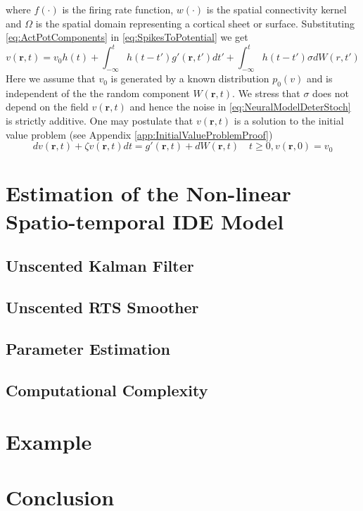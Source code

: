 \documentclass[11pt,draftcls,onecolumn,peerreview]{IEEEtran}
\begin{document}
where $f(\cdot)$ is the firing rate function, $w(\cdot)$ is the spatial connectivity kernel and $\Omega$ is the spatial domain representing a cortical sheet or surface. Substituting \eqref{eq:ActPotComponents} in \eqref{eq:SpikesToPotential} we get
\begin{equation}\label{eq:NeuralModelDeterStoch}
v\left( {\mathbf{r},t} \right)=v_0h(t)+\int_{ - \infty }^t {h\left( {t - t'} \right)g'\left( {\mathbf{r},t'} \right)dt'}+ \int_{ - \infty }^t h\left( {t - t'} \right)\sigma d W(r,t')
\end{equation}
Here we assume that $v_0$ is generated by a known distribution $p_0(v)$ and is independent of the the random component $W(\mathbf r,t)$. We stress that $\sigma$ does not depend on the field $v(\mathbf r, t)$
and hence the noise in \eqref{eq:NeuralModelDeterStoch} is strictly additive. One may postulate that $v(\mathbf r, t)$ is a solution to the initial value problem (see Appendix \ref{app:InitialValueProblemProof})
\begin{equation}
 dv(\mathbf r, t) + \zeta v(\mathbf r, t)dt = g'(\mathbf r, t) + dW(\mathbf r, t) \quad t\ge0, v(\mathbf r, 0) = v_0
\end{equation}

\section{Estimation of the Non-linear Spatio-temporal IDE Model}

\subsection{Unscented Kalman Filter}
\subsection{Unscented RTS Smoother}
\subsection{Parameter Estimation}
\subsection{Computational Complexity}
\section{Example}
\section{Conclusion}
\end{document}

